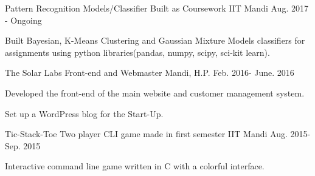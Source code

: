 \begin{cventries}
{      %
    }
      \cventry
    {Pattern Recognition Models/Classifier}
    {Built as Coursework}
    {IIT Mandi}
    {Aug. 2017 - Ongoing}
    {
      \begin{cvitems}
        \item {Built Bayesian, K-Means Clustering and Gaussian Mixture Models classifiers for assignments using python libraries(pandas, numpy, scipy, sci-kit learn).}
      \end{cvitems}
    }
     \cventry
    {The Solar Labs}
    {Front-end and Webmaster}
    {Mandi, H.P.}
    {Feb. 2016- June. 2016}
    {
      \begin{cvitems}
        \item {Developed the front-end of the main website and customer management system.}
        \item {Set up a WordPress blog for the Start-Up.}
      \end{cvitems}
    }
    \cventry
        {Tic-Stack-Toe}
    {Two player CLI game made in first semester}
    {IIT Mandi}
    {Aug. 2015- Sep. 2015}
    {
    \begin{cvitems}
    \item {Interactive command line game written in C with a colorful interface.}
   \end{cvitems}
    }

\end{cventries}
